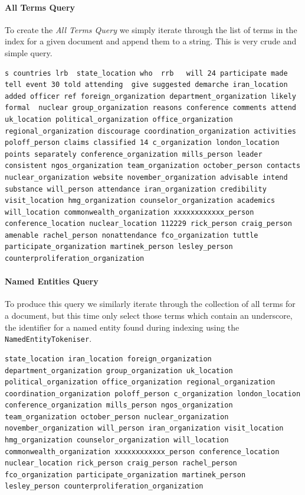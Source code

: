 \documentclass{l4proj}
\newcommand{\code}[1]{\texttt{#1}}
\newenvironment{codelisting}{\captionsetup{type=listing}}{}
\begin{document}
\paragraph{All Terms Query}
To create the \textit{All Terms Query} we simply iterate through the list of terms in the index for a given document and append them to a string. This is very crude and simple query.
\begin{codelisting}
\begin{verbatim}
s countries lrb  state_location who  rrb   will 24 participate made tell event 30 told attending  give suggested demarche iran_location added officer ref foreign_organization department_organization likely formal  nuclear group_organization reasons conference comments attend uk_location political_organization office_organization regional_organization discourage coordination_organization activities poloff_person claims classified 14 c_organization london_location points separately conference_organization mills_person leader consistent ngos_organization team_organization october_person contacts nuclear_organization website november_organization advisable intend substance will_person attendance iran_organization credibility visit_location hmg_organization counselor_organization academics will_location commonwealth_organization xxxxxxxxxxxx_person conference_location nuclear_location 112229 rick_person craig_person amenable rachel_person nonattendance fco_organization tuttle participate_organization martinek_person lesley_person counterproliferation_organization
\end{verbatim}
\label{code:all_terms_query}
\end{codelisting}

\paragraph{Named Entities Query}
To produce this query we similarly iterate through the collection of all terms for a document, but this time only select those terms which contain an underscore, the identifier for a named entity found during indexing using the \code{NamedEntityTokeniser}.
\begin{codelisting}
\begin{verbatim}
state_location iran_location foreign_organization department_organization group_organization uk_location political_organization office_organization regional_organization coordination_organization poloff_person c_organization london_location conference_organization mills_person ngos_organization team_organization october_person nuclear_organization november_organization will_person iran_organization visit_location hmg_organization counselor_organization will_location commonwealth_organization xxxxxxxxxxxx_person conference_location nuclear_location rick_person craig_person rachel_person fco_organization participate_organization martinek_person lesley_person counterproliferation_organization
\end{verbatim}
\label{code:ne_query}
\end{codelisting}
\end{document}
